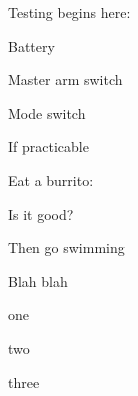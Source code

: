 \documentclass{article}
\begin{document}
Testing begins here:

\begin{checklist}
\item Battery 
\item Master arm switch 
\item Mode switch 
\item If practicable
  \begin{checklist}
  \item Eat a burrito:
    \begin{checklist}
    \item Is it good?
    \end{checklist}
  \item Then go swimming 
  \end{checklist}
\end{checklist}

Blah blah
\begin{checklist}
\item one
\item two
\item three
\end{checklist}
\end{document}
